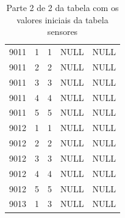 \documentclass[11pt,twoside,a4paper]{report}
\begin{document}
\begin{table}[H]
\begin{tabular}{|l|l|l|l|l|}
		9011 & 1 & 1 & NULL & NULL\\ \cline{1-5}
		9011 & 2 & 2 & NULL & NULL\\ \cline{1-5}
		9011 & 3 & 3 & NULL & NULL\\ \cline{1-5}
		9011 & 4 & 4 & NULL & NULL\\ \cline{1-5}
		9011 & 5 & 5 & NULL & NULL\\ \cline{1-5}
		9012 & 1 & 1 & NULL & NULL\\ \cline{1-5}
		9012 & 2 & 2 & NULL & NULL\\ \cline{1-5}
		9012 & 3 & 3 & NULL & NULL\\ \cline{1-5}
		9012 & 4 & 4 & NULL & NULL\\ \cline{1-5}
		9012 & 5 & 5 & NULL & NULL\\ \cline{1-5}
		9013 & 1 & 3 & NULL & NULL\\ \cline{1-5}
	\end{tabular}
	\caption[Parte 2 de 2 da tabela com os valores iniciais da tabela sensores]{Parte 2 de 2 da tabela com os valores iniciais da tabela sensores}
	\label{tab:dados6}
\end{table}

\cleardoublepage
\end{document}
